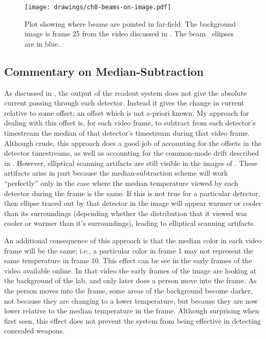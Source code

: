 \begin{figure}
\centering
\texttt{[image: drawings/ch8-beams-on-image.pdf]}
\caption{
  Plot showing where beams are pointed in far-field.
  The background image is frame 25 from the video discussed in .
  The beam \FWHM\ ellipses are in blue.
}
\label{fig:ch8-beams-on-image}
\end{figure}

\subsection{Commentary on Median-Subtraction}

As discussed in , the output of the readout system does not give the absolute current passing through each detector.
Instead it gives the change in current relative to some offset; an offset which is not a-priori known.
My approach for dealing with this offset is, for each video frame, to subtract from each detector's timestream the median of that detector's timestream during that video frame.
Although crude, this approach does a good job of accounting for the offsets in the detector timestreams, as well as accounting for the common-mode drift described in .
However, elliptical scanning artifacts are still visible in the images of .
These artifacts arise in part because the median-subtraction scheme will work ``perfectly'' only in the case where the median temperature viewed by each detector during the frame is the same.
If this is not true for a particular detector, then ellipse traced out by that detector in the image will appear warmer or cooler than its surroundings (depending whether the distribution that it viewed was cooler or warmer than it's surroundings), leading to elliptical scanning artifacts.

An additional consequence of this approach is that the median color in each video frame will be the same; i.e., a particular color in frame 1 may not represent the same temperature in frame 10.
This effect can be see in the early frames of the video available online.
In that video the early frames of the image are looking at the background of the lab, and only later does a person move into the frame.
As the person moves into the frame, some areas of the background become darker, not because they are changing to a lower temperature, but because they are now lower relative to the median temperature in the frame.
Although surprising when first seen, this effect does not prevent the system from being effective in detecting concealed weapons.

